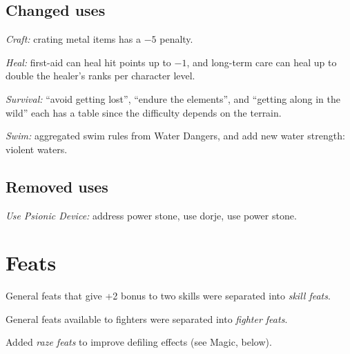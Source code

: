 \subsection{Changed uses}
\begin{itemize*}
\item \textit{Craft:} crating metal items has a $-5$ penalty.
\item \textit{Heal:} first-aid can heal hit points up to $-1$, and long-term care can heal up to double the healer's ranks per character level.
\item \textit{Survival:} ``avoid getting lost'', ``endure the elements'', and ``getting along in the wild'' each has a table since the difficulty depends on the terrain.
\item \textit{Swim:} aggregated swim rules from Water Dangers, and add new water strength: violent waters.
\end{itemize*}

\subsection{Removed uses}
\begin{itemize*}
\item \textit{Use Psionic Device:} address power stone, use dorje, use power stone.
\end{itemize*}

\section{Feats}
\begin{itemize*}
\item General feats that give +2 bonus to two skills were separated into \textit{skill feats}.
\item General feats available to fighters were separated into \textit{fighter feats}.
\item Added \textit{raze feats} to improve defiling effects (see Magic, below).
\end{itemize*}


